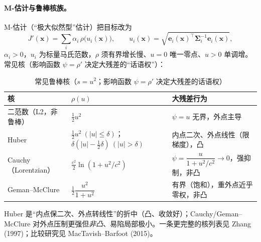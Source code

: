 \paragraph{M-估计与鲁棒核族。}\cite{barfoot2024state,gaoxiang2019slam14}
M-估计（“极大似然型”估计）把目标改为
\begin{equation}
  J'(\mathbf{x})=\sum_i\alpha_i\,\rho\big(u_i(\mathbf{x})\big),\qquad u_i(\mathbf{x})=\sqrt{\mathbf{e}_i(\mathbf{x})^\top\boldsymbol{\Sigma}_i^{-1}\mathbf{e}_i(\mathbf{x})},
  \label{eq:nlopt-mestim}
\end{equation}
$\alpha_i>0$，$u_i$ 为标量马氏范数，$\rho$ 须有界增长慢、$u=0$ 唯一零点、$u>0$ 单调增。常见核（影响函数 $\psi=\rho'$ 决定大残差的“话语权”）：

\begin{table}[H]\centering\small
\caption{常见鲁棒核（$s=u^2$；影响函数 $\psi=\rho'$ 决定大残差的话语权）}
\label{tab:robust}
\begin{tabular}{lll}
\toprule
核 & $\rho(u)$ & 大残差行为 \\
\midrule
二范数（L2，非鲁棒） & $\tfrac12 u^2$ & $\psi=u$ 无界，外点主导 \\
Huber & $\tfrac12u^2\ (|u|\le\delta)$；$\delta(|u|-\tfrac12\delta)\ (|u|>\delta)$ & 内点二次、外点线性（限梯度），凸 \\
Cauchy（Lorentzian） & $\tfrac{c^2}{2}\ln(1+u^2/c^2)$ & $\psi=\dfrac{u}{1+u^2/c^2}\to0$，强抑制，非凸 \\
Geman--McClure & $\tfrac12\dfrac{u^2}{1+u^2}$ & 有界（饱和），重外点近乎零权，非凸 \\
\bottomrule
\end{tabular}
\end{table}

\noindent Huber 是“内点保二次、外点转线性”的折中（凸、收敛好）；Cauchy/Geman--McClure 对外点压制更强但\emph{非凸}、易陷局部极小\cite{barfoot2024state}。一条更完整的核列表见 Zhang (1997)；比较研究见 MacTavish--Barfoot (2015)。

